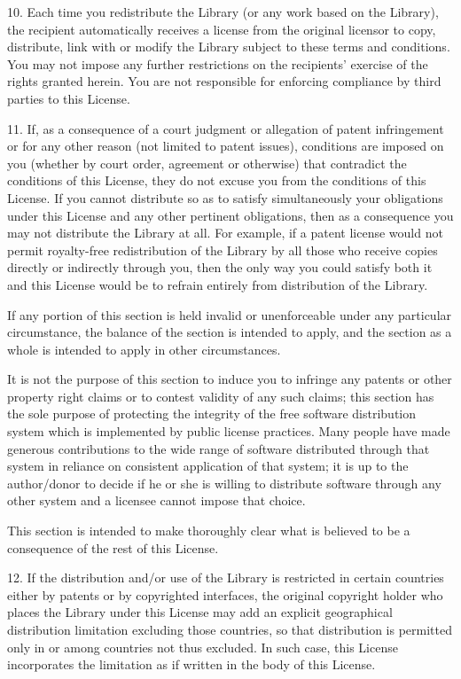 \documentclass[twoside]{tceusermanual}
\begin{document}
10. Each time you redistribute the Library (or any work based on
the Library), the recipient automatically receives a license
from the original licensor to copy, distribute, link with or
modify the Library subject to these terms and conditions.  You
may not impose any further restrictions on the recipients'
exercise of the rights granted herein. You are not responsible
for enforcing compliance by third parties to this License.
 
11. If, as a consequence of a court judgment or allegation of
patent infringement or for any other reason (not limited to
patent issues), conditions are imposed on you (whether by court
order, agreement or otherwise) that contradict the conditions of
this License, they do not excuse you from the conditions of this
License.  If you cannot distribute so as to satisfy
simultaneously your obligations under this License and any other
pertinent obligations, then as a consequence you may not
distribute the Library at all.  For example, if a patent license
would not permit royalty-free redistribution of the Library by
all those who receive copies directly or indirectly through you,
then the only way you could satisfy both it and this License
would be to refrain entirely from distribution of the Library.

If any portion of this section is held invalid or unenforceable
under any particular circumstance, the balance of the section is
intended to apply, and the section as a whole is intended to
apply in other circumstances.

It is not the purpose of this section to induce you to infringe
any patents or other property right claims or to contest
validity of any such claims; this section has the sole purpose
of protecting the integrity of the free software distribution
system which is implemented by public license practices.  Many
people have made generous contributions to the wide range of
software distributed through that system in reliance on
consistent application of that system; it is up to the
author/donor to decide if he or she is willing to distribute
software through any other system and a licensee cannot impose
that choice.

This section is intended to make thoroughly clear what is
believed to be a consequence of the rest of this License.

12. If the distribution and/or use of the Library is restricted
in certain countries either by patents or by copyrighted
interfaces, the original copyright holder who places the Library
under this License may add an explicit geographical distribution
limitation excluding those countries, so that distribution is
permitted only in or among countries not thus excluded.  In such
case, this License incorporates the limitation as if written in
the body of this License.
\end{document}
